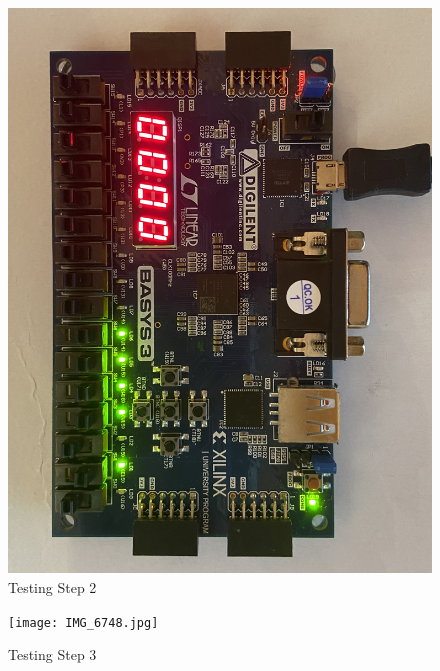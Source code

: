 \documentclass[11pt]{article}
\begin{document}
\begin{figure}[ht]\centering
	\includegraphics[angle=0, width=1.0\textwidth]{IMG_6747.jpg}
	\caption{Testing Step 2}
	\label{fig:sim_with_table}
\end{figure}
\clearpage

\begin{figure}[ht]\centering
	\texttt{[image: IMG\_6748.jpg]}
	\caption{Testing Step 3}
	\label{fig:sim_with_table}
\end{figure}
\clearpage
\end{document}
